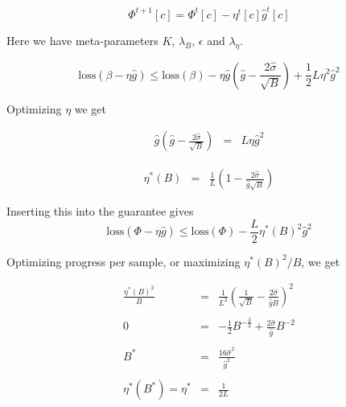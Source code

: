 {\vfill
$$\Phi^{t+1}[c] = \Phi^t[c] - \eta^t[c] \hat{g}^t[c]$$

\vfill
Here we have meta-parameters $K$, $\lambda_B$, $\epsilon$ and $\lambda_\eta$.


$$\mathrm{loss}(\beta - \eta\hat{g}) \leq \mathrm{loss}(\beta) - \eta \hat{g}\left(\hat{g} - \frac{2\hat{\sigma}}{\sqrt{B}} \right)  + \frac{1}{2}L \eta^2 \hat{g}^2$$

Optimizing $\eta$ we get

\begin{eqnarray*}
 \hat{g}\left(\hat{g} - \frac{2\hat{\sigma}}{\sqrt{B}} \right) & = & L \eta \hat{g}^2
\end{eqnarray*}


\begin{eqnarray*}
\eta^*(B) & = & \frac{1}{L}\left(1 - \frac{2\hat{\sigma}}{\hat{g}\sqrt{B}}\right)
\end{eqnarray*}

\vfill
Inserting this into the guarantee gives
$$\mathrm{loss}(\Phi - \eta \hat{g}) \leq \mathrm{loss}(\Phi) - \frac{L}{2}\eta^*(B)^2\hat{g}^2$$


Optimizing progress per sample, or maximizing $\eta^*(B)^2/B$, we get

\begin{eqnarray*}
\frac{\eta^*(B)^2}{B} & = & \frac{1}{L^2}\left(\frac{1}{\sqrt{B}} - \frac{2\hat{\sigma}}{\hat{g}B}\right)^2 \\
\\
0 & = &  - \frac{1}{2} B^{-\frac{3}{2}} + \frac{2\hat{\sigma}}{\hat{g}} B^{-2} \nonumber \\
\\
B^* & = & \frac{16\hat{\sigma}^2}{\hat{g}^2} \\
\\
\eta^*(B^*) = \eta^*  & = & \frac{1}{2L}
\end{eqnarray*}

}
